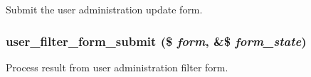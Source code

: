 Submit the user administration update form. \hypertarget{user_8admin_8inc_edf12621a6f405cf3032a9319771b4e1}{
\subsubsection[{user\_\-filter\_\-form\_\-submit}]{\setlength{\rightskip}{0pt plus 5cm}user\_\-filter\_\-form\_\-submit (\$ {\em form}, \/  \&\$ {\em form\_\-state})}}
\label{user_8admin_8inc_edf12621a6f405cf3032a9319771b4e1}


Process result from user administration filter form. 